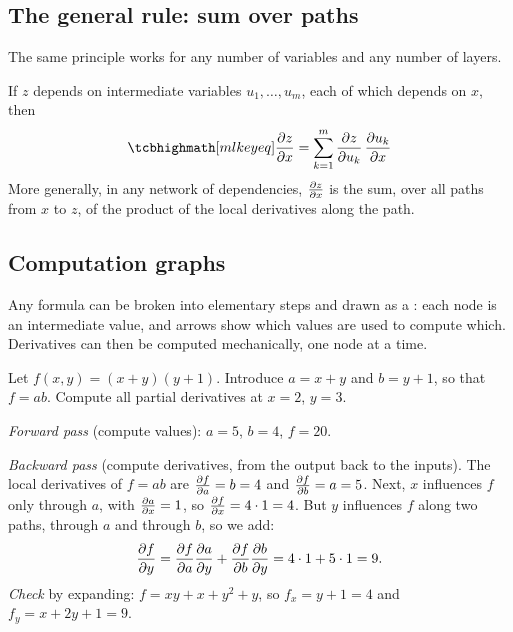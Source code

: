 \subsection{The general rule: sum over paths}

The same principle works for any number of variables and any number of
layers.

\begin{theorem}\label{thm:chain-general}
If $z$ depends on intermediate variables $u_1, \dots, u_m$, each of which
depends on $x$, then
\[
  \keyeq{\pderiv{z}{x} = \sum_{k=1}^{m}\pderiv{z}{u_k}\,\pderiv{u_k}{x}}
\]
More generally, in any network of dependencies, $\frac{\partial z}{\partial x}$ is the sum, over
all paths from $x$ to $z$, of the product of the local derivatives along the
path.
\end{theorem}

\subsection{Computation graphs}

Any formula can be broken into elementary steps and drawn as a
: each node is an intermediate value, and arrows show
which values are used to compute which. Derivatives can then be computed
mechanically, one node at a time.

\begin{example}\label{ex:computation-graph}
Let $f(x, y) = (x + y)(y + 1)$. Introduce $a = x + y$ and $b = y + 1$, so that
$f = ab$. Compute all partial derivatives at $x = 2$, $y = 3$.

\sol \emph{Forward pass} (compute values): $a = 5$, $b = 4$, $f = 20$.

\emph{Backward pass} (compute derivatives, from the output back to the
inputs). The local derivatives of $f = ab$ are $\frac{\partial f}{\partial a} = b = 4$ and
$\frac{\partial f}{\partial b} = a = 5$. Next, $x$ influences $f$ only through $a$, with
$\frac{\partial a}{\partial x} = 1$, so $\frac{\partial f}{\partial x} = 4\cdot1 = 4$. But $y$ influences $f$
along two paths, through $a$ and through $b$, so we add:
\[
  \frac{\partial f}{\partial y} = \frac{\partial f}{\partial a}\frac{\partial a}{\partial y} + \frac{\partial f}{\partial b}\frac{\partial b}{\partial y}
  = 4\cdot1 + 5\cdot1 = 9 .
\]
\emph{Check} by expanding: $f = xy + x + y^2 + y$, so $f_x = y + 1 = 4$ and
$f_y = x + 2y + 1 = 9$. \checkmark
\end{example}

